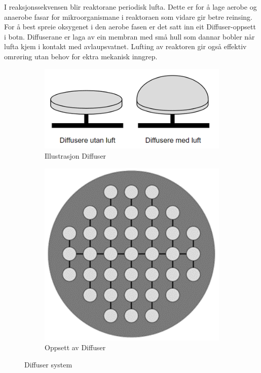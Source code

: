 I reaksjonssekvensen blir reaktorane periodisk lufta. Dette er for å lage aerobe og anaerobe fasar
for mikroorganismane i reaktoraen som vidare gir betre reinsing.
For å best spreie oksygenet i den aerobe fasen
er det satt inn eit \gls{Diffuser}-oppsett i botn.
\gls{Diffuser}ane er laga av ein membran med små hull som dannar bobler når lufta kjem i 
kontakt med avlaupsvatnet.
Lufting av reaktoren gir også effektiv omrøring utan behov for ektra mekanisk inngrep.

\begin{figure}[htbp]
    \centering
    \begin{subfigure}[b]{0.3\textwidth}
        \centering
        \includegraphics[width=1\textwidth]{Figurar/DiffusereMedOgUtanLuft.png}
        \caption{Illustrasjon \gls{Diffuser}}\label{fig:Illustrasjon diffuser}
    \end{subfigure}
    \hfill
    \begin{subfigure}[b]{0.3\textwidth}
        \centering
        \includegraphics[width=1\textwidth]{Figurar/DiffuserFraTopp.png}
        \caption{Oppsett av \gls{Diffuser}}\label{fig:Oppsett diffuser}
    \end{subfigure}
    \caption{\gls{Diffuser} system}\label{fig:Illustrasjon-Diffuser}
\end{figure}

